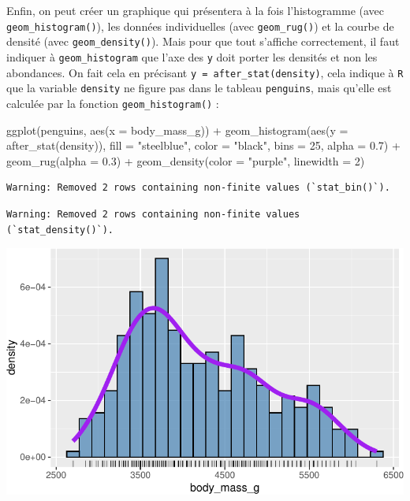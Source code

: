 \documentclass[
  a4paper,
  DIV=11,
  numbers=noendperiod,
  oneside]{scrreprt}
\newenvironment{Shaded}{}{}
\newcommand{\AttributeTok}[1]{\textcolor[rgb]{0.84,0.23,0.29}{#1}}
\newcommand{\DecValTok}[1]{\textcolor[rgb]{0.00,0.36,0.77}{#1}}
\newcommand{\FloatTok}[1]{\textcolor[rgb]{0.00,0.36,0.77}{#1}}
\newcommand{\FunctionTok}[1]{\textcolor[rgb]{0.44,0.26,0.76}{#1}}
\newcommand{\NormalTok}[1]{\textcolor[rgb]{0.14,0.16,0.18}{#1}}
\newcommand{\SpecialCharTok}[1]{\textcolor[rgb]{0.00,0.36,0.77}{#1}}
\newcommand{\StringTok}[1]{\textcolor[rgb]{0.01,0.18,0.38}{#1}}
\begin{document}
Enfin, on peut créer un graphique qui présentera à la fois l'histogramme
(avec \texttt{geom\_histogram()}), les données individuelles (avec
\texttt{geom\_rug()}) et la courbe de densité (avec
\texttt{geom\_density()}). Mais pour que tout s'affiche correctement, il
faut indiquer à \texttt{geom\_histogram} que l'axe des \texttt{y} doit
porter les densités et non les abondances. On fait cela en précisant
\texttt{y\ =\ after\_stat(density)}, cela indique à \texttt{R} que la
variable \texttt{density} ne figure pas dans le tableau
\texttt{penguins}, mais qu'elle est calculée par la fonction
\texttt{geom\_histogram()} :

\begin{Shaded}
\begin{Highlighting}[]
\FunctionTok{ggplot}\NormalTok{(penguins, }\FunctionTok{aes}\NormalTok{(}\AttributeTok{x =}\NormalTok{ body\_mass\_g)) }\SpecialCharTok{+}
  \FunctionTok{geom\_histogram}\NormalTok{(}\FunctionTok{aes}\NormalTok{(}\AttributeTok{y =} \FunctionTok{after\_stat}\NormalTok{(density)),}
                 \AttributeTok{fill =} \StringTok{"steelblue"}\NormalTok{, }\AttributeTok{color =} \StringTok{"black"}\NormalTok{,}
                 \AttributeTok{bins =} \DecValTok{25}\NormalTok{, }\AttributeTok{alpha =} \FloatTok{0.7}\NormalTok{) }\SpecialCharTok{+}
  \FunctionTok{geom\_rug}\NormalTok{(}\AttributeTok{alpha =} \FloatTok{0.3}\NormalTok{) }\SpecialCharTok{+}
  \FunctionTok{geom\_density}\NormalTok{(}\AttributeTok{color =} \StringTok{"purple"}\NormalTok{, }\AttributeTok{linewidth =} \DecValTok{2}\NormalTok{)}
\end{Highlighting}
\end{Shaded}

\begin{verbatim}
Warning: Removed 2 rows containing non-finite values (`stat_bin()`).
\end{verbatim}

\begin{verbatim}
Warning: Removed 2 rows containing non-finite values (`stat_density()`).
\end{verbatim}

\includegraphics{03-visualization_files/figure-pdf/unnamed-chunk-23-1.pdf}
\end{document}
